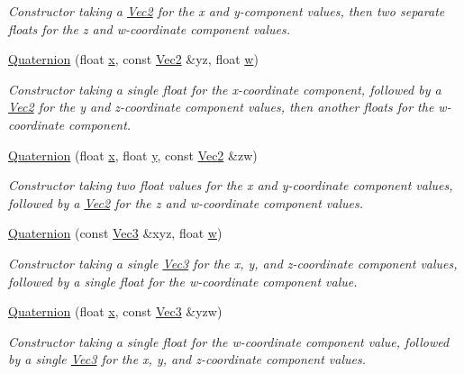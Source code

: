 \begin{DoxyCompactItemize}
\begin{DoxyCompactList}\small\item\em Constructor taking a \hyperlink{classgofxmath_1_1_vec2}{Vec2} for the x and y-\/component values, then two separate floats for the z and w-\/coordinate component values. \end{DoxyCompactList}\item 
\hyperlink{classgofxmath_1_1_quaternion_a88e06a4e2a1a5cd2112c263f4a63b0ae}{Quaternion} (float \hyperlink{classgofxmath_1_1_vec4_a5de27b4df2e699a1b30ec3a51258f208}{x}, const \hyperlink{classgofxmath_1_1_vec2}{Vec2} \&yz, float \hyperlink{classgofxmath_1_1_vec4_aeda815ed6e7a8febdffcdfa6cc8a2d04}{w})
\begin{DoxyCompactList}\small\item\em Constructor taking a single float for the x-\/coordinate component, followed by a \hyperlink{classgofxmath_1_1_vec2}{Vec2} for the y and z-\/coordinate component values, then another floats for the w-\/coordinate component. \end{DoxyCompactList}\item 
\hyperlink{classgofxmath_1_1_quaternion_a503611cdea6c48c28a4bac5882f7bee7}{Quaternion} (float \hyperlink{classgofxmath_1_1_vec4_a5de27b4df2e699a1b30ec3a51258f208}{x}, float \hyperlink{classgofxmath_1_1_vec4_a22b749162a1507a1a5d3968b70c6ee4d}{y}, const \hyperlink{classgofxmath_1_1_vec2}{Vec2} \&zw)
\begin{DoxyCompactList}\small\item\em Constructor taking two float values for the x and y-\/coordinate component values, followed by a \hyperlink{classgofxmath_1_1_vec2}{Vec2} for the z and w-\/coordinate component values. \end{DoxyCompactList}\item 
\hyperlink{classgofxmath_1_1_quaternion_adae87b5d4171194fa45756f02cf95b5e}{Quaternion} (const \hyperlink{classgofxmath_1_1_vec3}{Vec3} \&xyz, float \hyperlink{classgofxmath_1_1_vec4_aeda815ed6e7a8febdffcdfa6cc8a2d04}{w})
\begin{DoxyCompactList}\small\item\em Constructor taking a single \hyperlink{classgofxmath_1_1_vec3}{Vec3} for the x, y, and z-\/coordinate component values, followed by a single float for the w-\/coordinate component value. \end{DoxyCompactList}\item 
\hyperlink{classgofxmath_1_1_quaternion_a917b03d49d04edcca502cad038117ccf}{Quaternion} (float \hyperlink{classgofxmath_1_1_vec4_a5de27b4df2e699a1b30ec3a51258f208}{x}, const \hyperlink{classgofxmath_1_1_vec3}{Vec3} \&yzw)
\begin{DoxyCompactList}\small\item\em Constructor taking a single float for the w-\/coordinate component value, followed by a single \hyperlink{classgofxmath_1_1_vec3}{Vec3} for the x, y, and z-\/coordinate component values. \end{DoxyCompactList}\end{DoxyCompactItemize}
